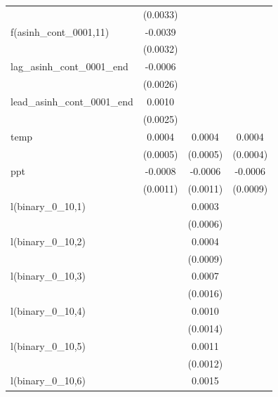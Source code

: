 \begin{tabular}{lccc}
                                    & (0.0033) &                       &   \\   
   f(asinh\_cont\_0001,11)          & -0.0039  &                       &   \\   
                                    & (0.0032) &                       &   \\   
   lag\_asinh\_cont\_0001\_end      & -0.0006  &                       &   \\   
                                    & (0.0026) &                       &   \\   
   lead\_asinh\_cont\_0001\_end     & 0.0010   &                       &   \\   
                                    & (0.0025) &                       &   \\   
   temp                             & 0.0004   & 0.0004                & 0.0004\\   
                                    & (0.0005) & (0.0005)              & (0.0004)\\   
   ppt                              & -0.0008  & -0.0006               & -0.0006\\   
                                    & (0.0011) & (0.0011)              & (0.0009)\\   
   l(binary\_0\_10,1)               &          & 0.0003                &   \\   
                                    &          & (0.0006)              &   \\   
   l(binary\_0\_10,2)               &          & 0.0004                &   \\   
                                    &          & (0.0009)              &   \\   
   l(binary\_0\_10,3)               &          & 0.0007                &   \\   
                                    &          & (0.0016)              &   \\   
   l(binary\_0\_10,4)               &          & 0.0010                &   \\   
                                    &          & (0.0014)              &   \\   
   l(binary\_0\_10,5)               &          & 0.0011                &   \\   
                                    &          & (0.0012)              &   \\   
   l(binary\_0\_10,6)               &          & 0.0015                &   \\   

\end{tabular}
